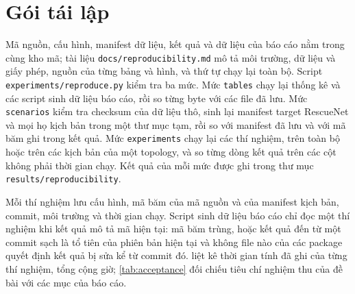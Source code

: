 \section{Gói tái lập}
\label{sec:appendix}

Mã nguồn, cấu hình, manifest dữ liệu, kết quả và dữ liệu của báo cáo nằm trong cùng kho mã; tài liệu \texttt{docs/reproducibility.md} mô tả môi trường, dữ liệu và giấy phép, nguồn của từng bảng và hình, và thứ tự chạy lại toàn bộ. Script \texttt{experiments/reproduce.py} kiểm tra ba mức. Mức \texttt{tables} chạy lại thống kê và các script sinh dữ liệu báo cáo, rồi so từng byte với các file đã lưu. Mức \texttt{scenarios} kiểm tra checksum của dữ liệu thô, sinh lại manifest target RescueNet và mọi họ kịch bản trong một thư mục tạm, rồi so với manifest đã lưu và với mã băm ghi trong kết quả. Mức \texttt{experiments} chạy lại các thí nghiệm, trên toàn bộ hoặc trên các kịch bản của một topology, và so từng dòng kết quả trên các cột không phải thời gian chạy. Kết quả của mỗi mức được ghi trong thư mục \texttt{results/reproducibility}.

Mỗi thí nghiệm lưu cấu hình, mã băm của mã nguồn và của manifest kịch bản, commit, môi trường và thời gian chạy. Script sinh dữ liệu báo cáo chỉ đọc một thí nghiệm khi kết quả mô tả mã hiện tại: mã băm trùng, hoặc kết quả đến từ một commit sạch là tổ tiên của phiên bản hiện tại và không file nào của các package quyết định kết quả bị sửa kể từ commit đó.  liệt kê thời gian tính đã ghi của từng thí nghiệm, tổng cộng \ResultExtComputeHours{} giờ; \cref{tab:acceptance} đối chiếu tiêu chí nghiệm thu của đề bài với các mục của báo cáo.




